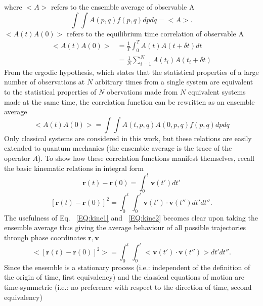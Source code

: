 %
where $<A>$ refers to the ensemble average of observable A
\begin{equation}
\int \int A(p,q) f(p,q) dpdq=<A>.
\end{equation}
$<A(t)A(0)>$ refers to the equilibrium time correlation of observable A
\begin{equation}
\begin{split}
<A(t)A(0)>&=\frac{1}{T}\int_0^TA(t)A(t+\delta t)dt\\
&=\frac{1}{N}\sum_{i=1}^NA(t_i)A(t_i+\delta t)
\end{split}
\end{equation}
From the ergodic hypothesis, which states that the statistical properties of a large number of observations at $N$ arbitrary times from a single system are equivalent to the statistical properties of $N$ obervations made from $N$ equivalent systems made at the same time, the correlation function can be rewritten as an ensemble average \cite{mcquarrie2000statistical}
\begin{equation}
<A( t)A(0)>=\int \int A(t,p,q)A(0,p,q) f(p,q) dpdq 
\end{equation}
Only classical systems are considered in this work, but these relations are easily extended to quantum mechanics (the ensemble average is the trace of the operator $A$). To show how these correlation functions manifest themselves, recall the basic kinematic relations in integral form
%
\begin{equation} \label{EQ:kine1}
\bm{r}(t)-\bm{r}(0)=\int_0^t \bm{v}(t')dt'
\end{equation}
\begin{equation} \label{EQ:kine2}
[\bm{r}(t)-\bm{r}(0)]^2=\int_0^t \int_0^t \bm{v}(t')\cdot\bm{v}(t'')dt'dt''.
\end{equation}
%
The usefulness of Eq. ~\ref {EQ:kine1} and ~\ref{EQ:kine2} becomes clear upon taking the ensemble average thus giving the average behaviour of all possible trajectories through phase coordinates $\bm{r},\bm{v}$
%
\begin{equation}
<[\bm{r}(t)-\bm{r}(0)]^2>=\int_0^t \int_0^t <\bm{v}(t')\cdot\bm{v}(t'')>dt'dt''.
\end{equation}
%
Since the ensemble is a stationary process (i.e.: independent of the definition of the origin of time, first equivalency) and the classical equations of motion are time-symmetric (i.e.: no preference with respect to the direction of time, second equivalency)
